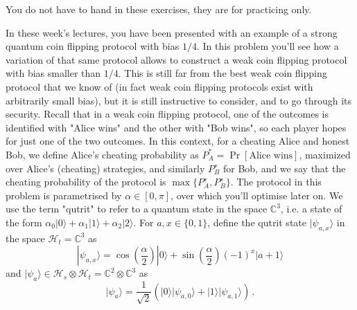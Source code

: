 \documentclass[a4paper,10pt,landscape,twocolumn]{scrartcl}
\newcommand{\ket}[1]{| #1 \rangle}
\begin{document}
\newcommand{\Hi}{\mathcal{H}}

\practiceproblems

{\sffamily\noindent
You do not have to hand in these exercises, they are for practicing only. %
}

\begin{exercise}
In these week's lectures, you have been presented with an example of a strong quantum coin flipping protocol with bias $1/4$. In this problem you'll see how a variation of that same protocol allows to construct a weak coin flipping protocol with bias smaller than $1/4$. This is still far from the best weak coin flipping protocol that we know of (in fact weak coin flipping protocols exist with arbitrarily small bias), but it is still instructive to consider, and to go through its security. 
Recall that in a weak coin flipping protocol, one of the outcomes is identified with "Alice wins" and the other with "Bob wins", so each player hopes for just one of the two outcomes. In this context, for a cheating Alice and honest Bob, we define Alice's cheating probability as $P_A^*=\Pr[\text{Alice wins}]$, maximized over Alice's (cheating) strategies, and similarly $P_B^∗$ for Bob, and we say that the cheating probability of the protocol is $\max\{P_A^∗,P_B^∗\}$. The protocol in this problem is parametrised by $\alpha \in [0,\pi]$, over which you'll optimise later on. 
We use the term "qutrit" to refer to a quantum state in the space $\mathbb{C}^3$, i.e. a state of the form $\alpha_0\ket{0}+\alpha_1\ket{1} + \alpha_2 \ket{2}$. For $a,x \in \{0,1\}$, define the qutrit state $\ket{\psi_{a,x}}$ in the space $\mathcal{H}_t = \mathbb{C}^3$ as
\[
\ket{\psi_{a,x}} = \cos(\frac{\alpha}{2}) \ket{0} + \sin(\frac{\alpha}{2}) (-1)^x \ket{a+1}
\]
and $\ket{\psi_a} \in \mathcal{H}_s \otimes \mathcal{H}_t = \mathbb{C}^2 \otimes \mathbb{C}^3$ as 
\[
\ket{\psi_a} = \frac{1}{\sqrt{2}} ( \ket{0} \ket{\psi_{a,0}} + \ket{1} \ket{\psi_{a,1}} ) \, .
\]


\end{exercise}
\end{document}
